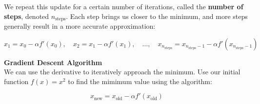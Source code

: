 \documentclass[11pt]{article}
\begin{document}
We repeat this update for a certain number of iterations, called the \textbf{number of steps}, denoted $n_\text{steps}$. Each step brings us closer to the minimum, and more steps generally result in a more accurate approximation:

\[
x_1 = x_0 - \alpha f'(x_0), \quad
x_2 = x_1 - \alpha f'(x_1), \quad
\ldots, \quad
x_{n_\text{steps}} = x_{n_\text{steps}-1} - \alpha f'(x_{n_\text{steps}-1})
\]



















\newpage
{\bf Gradient Descent Algorithm}\\
We can use the derivative to iteratively approach the minimum. Use our initial function $f(x) = x^2$ to find the mimimum value using the algorithm:

\[
x_{\text{new}} = x_{\text{old}} - \alpha f'(x_{\text{old}})
\]

\end{document}
